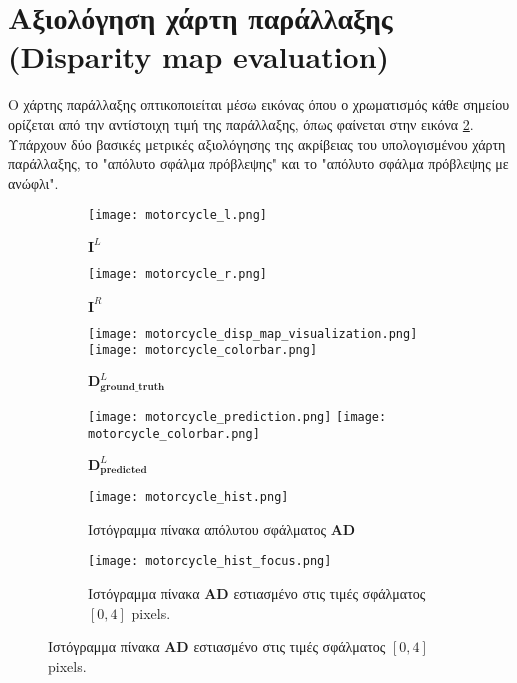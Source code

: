\section{Αξιολόγηση χάρτη παράλλαξης \texorpdfstring{\e (Disparity map evaluation) \g}{TEXT}}

Ο χάρτης παράλλαξης οπτικοποιείται μέσω εικόνας όπου ο χρωματισμός κάθε σημείου ορίζεται από την αντίστοιχη τιμή της παράλλαξης, όπως φαίνεται στην εικόνα \ref{fig:motorcycle_disp_map}. Υπάρχουν δύο βασικές μετρικές αξιολόγησης της ακρίβειας του υπολογισμένου χάρτη παράλλαξης, το "απόλυτο σφάλμα πρόβλεψης" και το "απόλυτο σφάλμα πρόβλεψης με ανώφλι".

\begin{figure}
	\centering
	\begin{subfigure}{0.48\textwidth}
		\texttt{[image: motorcycle\_l.png]}
		\caption{$\textbf{I}^L$}
		\label{fig:motorcycle}
	\end{subfigure}
	\begin{subfigure}{0.48\textwidth}
		\texttt{[image: motorcycle\_r.png]}
		\caption{$\textbf{I}^R$}
	\end{subfigure}
	
	\begin{subfigure}{0.48\textwidth}
		\texttt{[image: motorcycle\_disp\_map\_visualization.png]}
		\texttt{[image: motorcycle\_colorbar.png]}
		\caption{$\mathbf{D}_{\mathbf{ground\_truth}}^L$}
		\label{fig:motorcycle_disp_map} 
	\end{subfigure}
	\begin{subfigure}{0.48\textwidth}
		\texttt{[image: motorcycle\_prediction.png]}
		\texttt{[image: motorcycle\_colorbar.png]}
		\caption{$\mathbf{D}_{\mathbf{predicted}}^L$}
		\label{fig:motorcycle_pred_disp_map}
	\end{subfigure}
	
	\begin{subfigure}{0.48\textwidth}
		\texttt{[image: motorcycle\_hist.png]}
		\caption{Ιστόγραμμα πίνακα απόλυτου σφάλματος $\mathbf{AD}$}
		\label{fig:motorcycle_hist}
	\end{subfigure}
	\begin{subfigure}{0.48\textwidth}
		\texttt{[image: motorcycle\_hist\_focus.png]}
		\caption{Ιστόγραμμα πίνακα $\mathbf{AD}$ εστιασμένο στις τιμές σφάλματος $[0,4]$ \e pixels. \g}
		\label{fig:motorcycle_hist_focus}
	\end{subfigure}
	

\end{figure}
